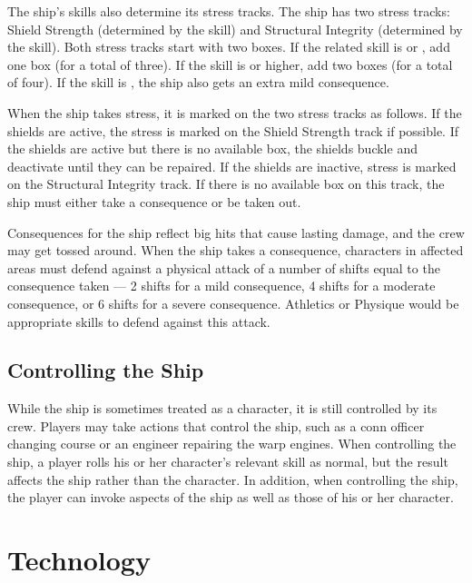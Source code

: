 \documentclass[12pt,titlepage,openany]{book}
\begin{document}
The ship's skills also determine its stress tracks. The ship has two stress
tracks: Shield Strength (determined by the  skill) and
Structural Integrity (determined by the  skill). Both stress
tracks start with two boxes. If the related skill is  or
, add one box (for a total of three). If the skill is 
or higher, add two boxes (for a total of four). If the skill is ,
the ship also gets an extra mild consequence.

When the ship takes stress, it is marked on the two stress tracks as follows.
If the shields are active, the stress is marked on the Shield Strength track if
possible. If the shields are active but there is no available box, the shields
buckle and deactivate until they can be repaired. If the shields are inactive,
stress is marked on the Structural Integrity track. If there is no available
box on this track, the ship must either take a consequence or be taken out.

Consequences for the ship reflect big hits that cause lasting damage, and the
crew may get tossed around. When the ship takes a consequence, characters in
affected areas must defend against a physical attack of a number of shifts
equal to the consequence taken --- 2 shifts for a mild consequence, 4 shifts
for a moderate consequence, or 6 shifts for a severe consequence. Athletics or
Physique would be appropriate skills to defend against this attack.

\section{Controlling the Ship}\label{sec:control-ship}
While the ship is sometimes treated as a character, it is still controlled by
its crew. Players may take actions that control the ship, such as a conn
officer changing course or an engineer repairing the warp engines. When
controlling the ship, a player rolls his or her character's relevant skill as
normal, but the result affects the ship rather than the character. In addition,
when controlling the ship, the player can invoke aspects of the ship as well as
those of his or her character.



\chapter{Technology}\label{chap:technology}
\end{document}
